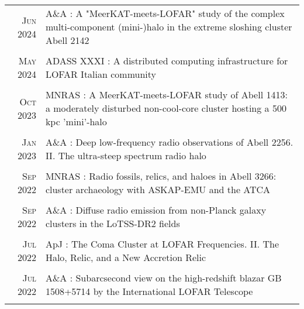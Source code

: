 \documentclass[11pt,a4paper,notitlepage]{article}
\begin{document}
\begin{tabular}{r|p{12.5cm}}
	
%	

	\textsc{Jun 2024} & A\&A : A "MeerKAT-meets-LOFAR" study of the complex multi-component (mini-)halo in the extreme sloshing cluster Abell 2142 \citep{2024AA...686A..44R} \\
	\multicolumn{2}{c}{} \\

	\textsc{May 2024} & ADASS XXXI : A distributed computing infrastructure for LOFAR Italian community \citep{2024ASPC..535..397T} \\
	\multicolumn{2}{c}{} \\

	\textsc{Oct 2023} & MNRAS : A MeerKAT-meets-LOFAR study of Abell 1413: a moderately disturbed non-cool-core cluster hosting a 500 kpc 'mini'-halo \citep{2023MNRAS.524.6052R} \\
	\multicolumn{2}{c}{} \\

	\textsc{Jan 2023} & A\&A : Deep low-frequency radio observations of Abell 2256. II. The ultra-steep spectrum radio halo \citep{2023AA...669A...1R} \\
	\multicolumn{2}{c}{} \\

	\textsc{Sep 2022} & MNRAS : Radio fossils, relics, and haloes in Abell 3266: cluster archaeology with ASKAP-EMU and the ATCA \citep{2022MNRAS.515.1871R} \\
	\multicolumn{2}{c}{} \\

	\textsc{Sep 2022} & A\&A : Diffuse radio emission from non-Planck galaxy clusters in the LoTSS-DR2 fields \citep{2022AA...665A..60H} \\
	\multicolumn{2}{c}{} \\

	\textsc{Jul 2022} & ApJ : The Coma Cluster at LOFAR Frequencies. II. The Halo, Relic, and a New Accretion Relic \citep{2022ApJ...933..218B} \\
	\multicolumn{2}{c}{} \\

	\textsc{Jul 2022} & A\&A : Subarcsecond view on the high-redshift blazar GB 1508+5714 by the International LOFAR Telescope \citep{2022AA...663A..44K} \\
	\multicolumn{2}{c}{} \\



\end{tabular}
\end{document}
